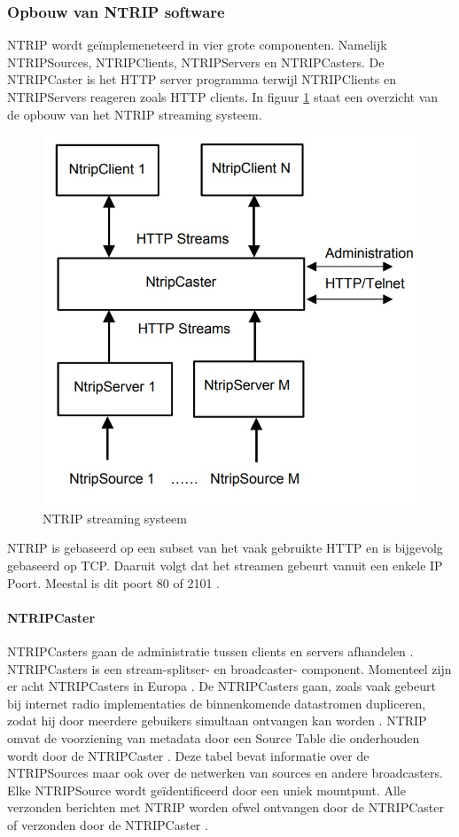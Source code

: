 \subsubsection{Opbouw van NTRIP software}
\label{LONS}
NTRIP wordt ge\"implemeneteerd in vier grote componenten. Namelijk NTRIPSources, NTRIPClients, NTRIPServers en NTRIPCasters. De NTRIPCaster is het HTTP server programma terwijl NTRIPClients en NTRIPServers reageren zoals HTTP clients\cite{LBibNTRIP}.  In figuur \ref{imgNTRIP} staat een overzicht van de opbouw van het NTRIP streaming systeem.

\begin{figure}[hpb]
	\includegraphics[scale=0.55]{NTRIP.jpg}
	\caption{NTRIP streaming systeem \cite{LBibNTRIP}}
	\label{imgNTRIP}
\end{figure} 
NTRIP is gebaseerd op een subset van het vaak gebruikte HTTP en is bijgevolg gebaseerd op TCP. Daaruit volgt dat het streamen gebeurt vanuit een enkele IP Poort. Meestal is dit poort 80 of 2101 \cite{LBibNTRIP3}. 

\paragraph{NTRIPCaster}
 NTRIPCasters gaan de administratie tussen clients en servers afhandelen \cite{LBibGPS}. NTRIPCasters is een stream-splitser- en broadcaster- component. Momenteel zijn er acht NTRIPCasters in Europa \cite{LBibNTRIP}. De NTRIPCasters gaan, zoals vaak gebeurt bij internet radio implementaties de binnenkomende datastromen dupliceren, zodat hij door meerdere gebuikers simultaan ontvangen kan worden \cite{LBibNTRIP2}. NTRIP omvat de voorziening van metadata door een Source Table die onderhouden wordt door de NTRIPCaster \cite{LBibNTRIP3}. Deze tabel bevat informatie over de NTRIPSources maar ook over de netwerken van sources en andere broadcasters. Elke NTRIPSource wordt ge\"identificeerd door een uniek mountpunt. Alle verzonden berichten met NTRIP worden ofwel ontvangen door de NTRIPCaster of verzonden door de NTRIPCaster \cite{LBibNTRIP4}.
 
